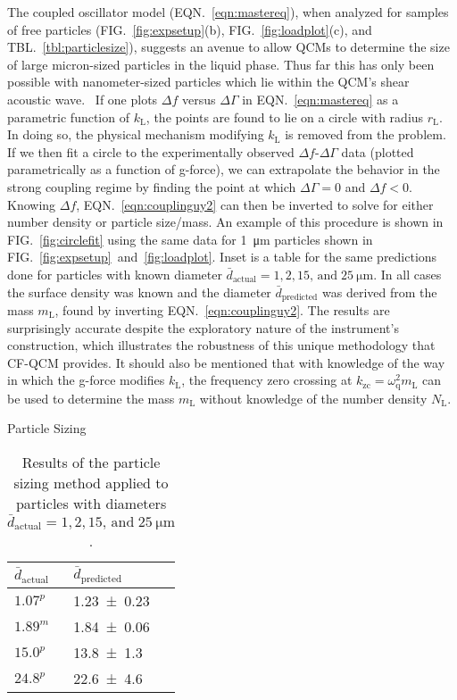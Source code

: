 \documentclass[floatfix,superscriptaddress,a4paper,twocolumn]{revtex4-1}
\newcommand{\Figure}[1]{FIG.~\ref{#1}}
\newcommand{\Figures}[2]{FIG.~\ref{#1}~and~\ref{#2}}
\newcommand{\Equation}[1]{EQN.~\ref{#1}}
\newcommand{\Table}[1]{TBL.~\ref{#1}}
\newcommand{\df}{\Delta\!f}
\newcommand{\dg}{\Delta\Gamma}
\newcommand{\kl}{k_\mathrm{L}}
\newcommand{\ml}{m_\mathrm{L}}
\newcommand{\omegaq}{\omega_\mathrm{q}}
\begin{document}
The coupled oscillator model (\Equation{eqn:mastereq}), when analyzed for
samples of free particles (\Figure{fig:expsetup}(b),
\Figure{fig:loadplot}(c), and \Table{tbl:particlesize}), suggests an avenue
to allow QCMs to determine the size of large micron-sized particles in the
liquid phase.  Thus far this has only been possible with nanometer-sized
particles which lie within the QCM's shear acoustic
wave.~\cite{olsson2013using}  If one plots $\df$ versus $\dg$ in
\Equation{eqn:mastereq} as a parametric function of $\kl$, the points are
found to lie on a circle with radius $r_\mathrm{L}$.  In doing so, the physical
mechanism modifying $\kl$ is removed from the problem.
If we then fit a
circle to the experimentally observed $\df$-$\dg$ data (plotted
parametrically as a function of g-force), we can extrapolate the behavior
in the strong coupling regime by finding the point at which $\dg=0$ and
$\df<0$.  Knowing $\df$, \Equation{eqn:couplinguy2} can then be inverted to
solve for either number density or particle size/mass.  An example of this
procedure is shown in \Figure{fig:circlefit} using the same data for
\SI{1}{\micro\meter} particles shown in
\Figures{fig:expsetup}{fig:loadplot}.  Inset is a table for the same
predictions done for particles with known diameter
$\bar{d}_\mathrm{actual}=1, 2, 15,\,\mathrm{and}\;\SI{25}{\micro\meter}$.
In all cases the surface density was known and the diameter
$\bar{d}_\text{predicted}$ was derived from the mass $\ml$, found by
inverting \Equation{eqn:couplinguy2}.  The results are surprisingly accurate
despite the exploratory nature of the instrument's construction, which
illustrates the robustness of this unique methodology that CF-QCM
provides.
It should also be mentioned that with knowledge of the way in which the
g-force modifies $\kl$, the frequency zero crossing at
$k_\mathrm{zc}=\omegaq^2\ml$ can be used to determine the mass $\ml$
without knowledge of the number density $N_\mathrm{L}$.
\begin{table}[ht]
\centering
Particle Sizing\\
 \begin{tabularx}{80pt}{XX}
 \toprule
 $\bar{d}_\mathrm{actual}$ & $\bar{d}_\mathrm{predicted}$ \\
 \midrule
  $1.07^p$ & \num{1.23+-0.23} \\
  $1.89^m$ & \num{1.84+-0.06} \\
  $15.0^p$ & \num{13.8+-1.3} \\
  $24.8^p$ & \num{22.6+-4.6} \\
 \bottomrule
\end{tabularx}
\caption{Results of the particle sizing method applied to particles with diameters
$\bar{d}_\mathrm{actual}=1, 2, 15,\,\mathrm{and}\;\SI{25}{\micro\meter}$.}
\label{tbl:particlesizing}
\end{table}
\end{document}
